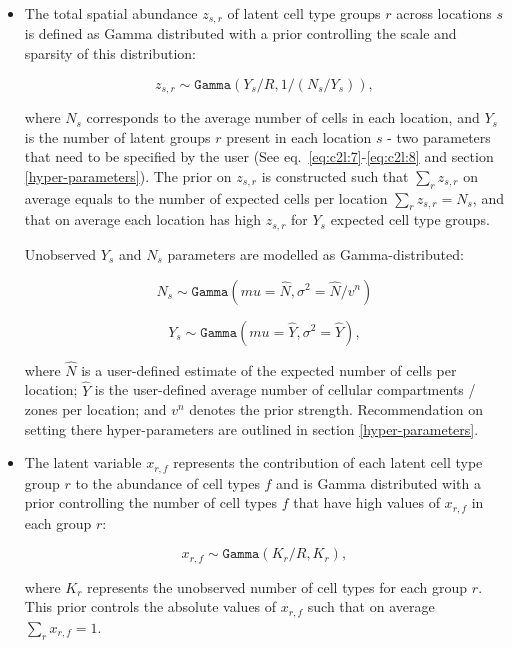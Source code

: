 \documentclass[11pt,a4paper]{article}
\begin{document}
\begin{enumerate}
    \begin{itemize}
        \item The total spatial abundance $z_{s,r}$ of latent cell type groups $r$ across locations $s$ is defined as Gamma distributed with a prior controlling the scale and sparsity of this distribution:
        \begin{linenomath*} \begin{equation} \label{eq:c2l:6}
        z_{s,r} \sim \mathtt{Gamma}(Y_s / R, 1 / (N_s / Y_s)),
        \end{equation} \end{linenomath*}
    
        where $N_s$ corresponds to the average number of cells in each location, and $Y_s$ is the number of latent groups $r$  present in each location $s$ - two parameters that need to be specified by the user (See eq.~\eqref{eq:c2l:7}-\eqref{eq:c2l:8} and  section \ref{hyper-parameters}). The prior on $z_{s,r}$ is constructed such that $\sum_{r} z_{s,r}$ on average equals to the number of expected cells per location $\sum_{r} z_{s,r} = N_s$, and that on average each location has high $z_{s,r}$ for $Y_s$ expected cell type groups. 
        
        Unobserved $Y_s$ and $N_s$ parameters are modelled as Gamma-distributed:
        \begin{linenomath*} \begin{equation} \label{eq:c2l:7}
        N_s \sim \mathtt{Gamma}(mu=\hat{N}, \sigma^2=\hat{N} / v^{n})
        \end{equation} \end{linenomath*}
        \begin{linenomath*} \begin{equation} \label{eq:c2l:8}
        Y_s \sim \mathtt{Gamma}(mu=\hat{Y}, \sigma^2=\hat{Y}),
        \end{equation} \end{linenomath*}
        where $\hat{N}$ is a user-defined estimate of the expected number of cells per location; $\hat{Y}$ is the user-defined average number of cellular compartments / zones per location; and $v^{n}$ denotes the prior strength. Recommendation on setting there hyper-parameters are outlined in section \ref{hyper-parameters}.
        
        \item The latent variable $x_{r,f}$ represents the contribution of each latent cell type group $r$ to the abundance of cell types $f$ and is Gamma distributed with a prior controlling the number of cell types $f$ that have high values of $x_{r,f}$ in each group $r$:
        \begin{linenomath*} \begin{equation} \label{eq:c2l:10}
        x_{r,f} \sim \mathtt{Gamma}(K_r / R, K_r),
        \end{equation} \end{linenomath*}
        where $K_r$ represents the unobserved number of cell types for each group $r$. This prior controls the absolute values of $x_{r,f}$ such that on average $\sum_{r} x_{r,f} = 1$.
        

\end{itemize}
\end{enumerate}
\end{document}
